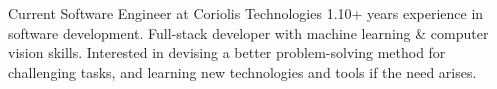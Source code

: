 

\begin{cvparagraph}

Current Software Engineer at Coriolis Technologies 1.10+ years experience in software development. Full-stack developer with machine learning \& computer vision skills. Interested in devising a better problem-solving method for challenging tasks, and learning new technologies and tools if the need arises.
\end{cvparagraph}
